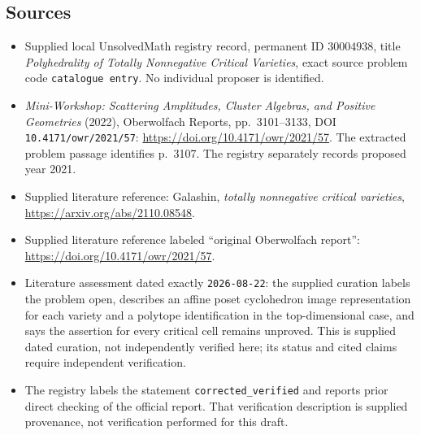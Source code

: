 \documentclass[11pt]{article}
\begin{document}
\subsection{Sources}
\begin{itemize}
\item Supplied local UnsolvedMath registry record, permanent ID \(30004938\), title \emph{Polyhedrality of Totally Nonnegative Critical Varieties}, exact source problem code \texttt{catalogue entry}. No individual proposer is identified.
\item \emph{Mini-Workshop: Scattering Amplitudes, Cluster Algebras, and Positive Geometries} (2022), Oberwolfach Reports, pp.\ 3101--3133, DOI \texttt{10.4171/owr/2021/57}: \url{https://doi.org/10.4171/owr/2021/57}. The extracted problem passage identifies p.\ 3107. The registry separately records proposed year 2021.
\item Supplied literature reference: Galashin, \emph{totally nonnegative critical varieties}, \url{https://arxiv.org/abs/2110.08548}.
\item Supplied literature reference labeled ``original Oberwolfach report'': \url{https://doi.org/10.4171/owr/2021/57}.
\item Literature assessment dated exactly \texttt{2026-08-22}: the supplied curation labels the problem open, describes an affine poset cyclohedron image representation for each variety and a polytope identification in the top-dimensional case, and says the assertion for every critical cell remains unproved. This is supplied dated curation, not independently verified here; its status and cited claims require independent verification.
\item The registry labels the statement \texttt{corrected\_verified} and reports prior direct checking of the official report. That verification description is supplied provenance, not verification performed for this draft.
\end{itemize}
\end{document}
